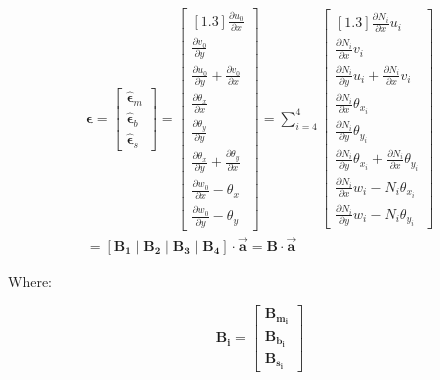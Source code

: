 \begin{multline}
\boldsymbol{\epsilon} = \begin{bmatrix}
{\hat{\boldsymbol{\epsilon}}}_{m} \\
{\hat{\boldsymbol{\epsilon}}}_{b} \\
{\hat{\boldsymbol{\epsilon}}}_{s}
\end{bmatrix} = \begin{bmatrix}[1.3]
\frac{\partial u_{0}}{\partial x} \\
\frac{\partial v_{0}}{\partial y} \\
\frac{\partial u_{0}}{\partial y} + \frac{\partial v_{0}}{\partial x} \\
\frac{\partial\theta_{x}}{\partial x} \\
\frac{\partial\theta_{y}}{\partial y} \\
\frac{\partial\theta_{x}}{\partial y} + \frac{\partial\theta_{y}}{\partial x} \\
\frac{\partial w_{0}}{\partial x} - \theta_{x} \\
\frac{\partial w_{0}}{\partial y} - \theta_{y}
\end{bmatrix} = \sum_{i = 4}^{4}\begin{bmatrix}[1.3]
\frac{\partial N_{i}}{\partial x}u_{i} \\
\frac{\partial N_{i}}{\partial x}v_{i} \\
\frac{\partial N_{i}}{\partial y}u_{i} + \frac{\partial N_{i}}{\partial x}v_{i} \\
\frac{\partial N_{i}}{\partial x}\theta_{x_{i}} \\
\frac{\partial N_{i}}{\partial y}\theta_{y_{i}} \\
\frac{\partial N_{i}}{\partial y}\theta_{x_{i}} + \frac{\partial N_{i}}{\partial x}\theta_{y_{i}} \\
\frac{\partial N_{i}}{\partial x}w_{i} - N_{i}\theta_{x_{i}} \\
\frac{\partial N_{i}}{\partial y}w_{i} - N_{i}\theta_{y_{i}}
\end{bmatrix}\\
= \left\lbrack \mathbf{B_1}\mid\mathbf{B_2}\mid\mathbf{B_3}\mid \mathbf{B_4}\right\rbrack \cdot \vec{\mathbf{a}} = \mathbf{B} \cdot \vec{\mathbf{a}}
\end{multline}


Where:

\[\mathbf{B}_{\mathbf{i}}=\begin{bmatrix}
\mathbf{B}_{\mathbf{m}_{\mathbf{i}}} \\
\mathbf{B}_{\mathbf{b}_{\mathbf{i}}} \\
\mathbf{B}_{\mathbf{s}_{\mathbf{i}}}
\end{bmatrix}\]


